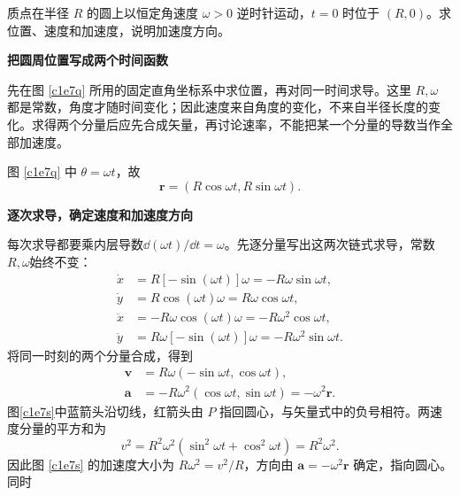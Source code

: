 \begin{question}
\begin{example}[圆周运动的分量求导]
质点在半径 $R$ 的圆上以恒定角速度 $\omega>0$ 逆时针运动，$t=0$ 时位于 $(R,0)$。求位置、速度和加速度，说明加速度方向。
\end{example}
\end{question}
\begin{solution}\textbf{把圆周位置写成两个时间函数}\par\nobreak
先在图 \ref{c1e7q} 所用的固定直角坐标系中求位置，再对同一时间求导。这里 $R,\omega$ 都是常数，角度才随时间变化；因此速度来自角度的变化，不来自半径长度的变化。求得两个分量后应先合成矢量，再讨论速率，不能把某一个分量的导数当作全部加速度。

图 \ref{c1e7q} 中 $\theta=\omega t$，故
\[
 \bm r=(R\cos\omega t,R\sin\omega t).
\]



\par\medskip{}\noindent\textbf{逐次求导，确定速度和加速度方向}\par\nobreak
每次求导都要乘内层导数$\dd(\omega t)/\dd t=\omega$。先逐分量写出这两次链式求导，常数$R,\omega$始终不变：
\begin{align*}
\dot x&=R[-\sin(\omega t)]\omega=-R\omega\sin\omega t,\\
\dot y&=R\cos(\omega t)\omega=R\omega\cos\omega t,\\
\ddot x&=-R\omega\cos(\omega t)\omega=-R\omega^2\cos\omega t,\\
\ddot y&=R\omega[-\sin(\omega t)]\omega=-R\omega^2\sin\omega t.
\end{align*}
将同一时刻的两个分量合成，得到
\begin{align*}
 \bm v&=R\omega(-\sin\omega t,\cos\omega t),\\
 \bm a&=-R\omega^2(\cos\omega t,\sin\omega t)=-\omega^2\bm r.
\end{align*}
图\ref{c1e7s}中蓝箭头沿切线，红箭头由 $P$ 指回圆心，与矢量式中的负号相符。两速度分量的平方和为
\[
 v^2=R^2\omega^2(\sin^2\omega t+\cos^2\omega t)=R^2\omega^2.
\]
因此图 \ref{c1e7s} 的加速度大小为 $R\omega^2=v^2/R$，方向由 $\bm a=-\omega^2\bm r$ 确定，指向圆心。同时


\end{solution}
